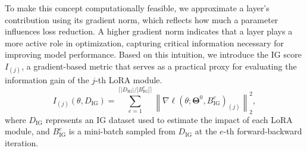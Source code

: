 \documentclass[sigconf]{acmart}
\begin{document}
To make this concept computationally feasible, we approximate a layer’s contribution using its gradient norm, which reflects how much a parameter influences loss reduction. A higher gradient norm indicates that a layer plays a more active role in optimization, capturing critical information necessary for improving model performance. Based on this intuition, we introduce the IG score $I_{(j)}$, a gradient-based metric that serves as a practical proxy for evaluating the information gain of the $j$-th LoRA module. 
\begin{equation}\label{eq:igscore}
I_{(j)}(\boldsymbol{\mathcal{\theta}}, D_{\text{IG}})=\sum^{ \lceil|D_{\text{IG}}|/|B^e_{\text{IG}}| \rceil}_{e=1}\left\|\nabla \ell(\boldsymbol{\mathcal{\theta}}; \boldsymbol{\Theta}^0, B_{\text{IG}}^e)_{(j)}\right\|_2^2,
\end{equation}
where $D_{\text{IG}}$ represents an IG dataset used to estimate the impact of each LoRA module, and $B_{\text{IG}}^{e}$ is a mini-batch sampled from $D_{\text{IG}}$ at the $e$-th forward-backward iteration. 



\end{document}
